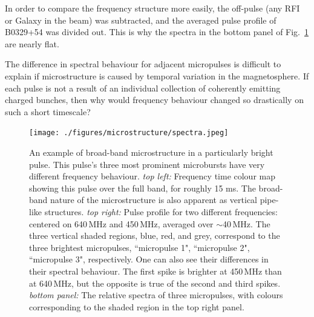 In order to 
compare the frequency structure more easily, the off-pulse 
(any RFI or Galaxy in the beam) was subtracted, and the 
averaged pulse profile of B0329+54 was divided out.
This is why the spectra in the bottom panel of Fig.~\ref{fig-spectralvar}
are nearly flat. 

The difference in spectral behaviour for 
adjacent micropulses is difficult to explain 
if microstructure is caused by temporal 
variation in the magnetosphere. If each pulse is not a result 
of an individual collection of coherently emitting 
charged bunches, then why would frequency behaviour 
changed so drastically on such a short timescale?

\begin{figure}[!h]
\vspace{-0.5cm}
\begin{center}
\texttt{[image: ./figures/microstructure/spectra.jpeg]}
\caption{An example of broad-band microstructure in a 
particularly bright pulse. This pulse's three most prominent 
microbursts have very different frequency behaviour. \textit{top left:}
Frequency time colour map showing this pulse over the 
full band, for roughly 15 ms. The broad-band nature of 
the microstructure is also apparent as 
vertical pipe-like structures. \textit{top right:} Pulse 
profile for two different frequencies: centered on 640\,MHz and 450\,MHz, 
averaged over $\sim$40\,MHz. The three vertical shaded regions, 
blue, red, and grey, correspond to the three brightest 
micropulses, ``micropulse 1", ``micropulse 2", ``micropulse 3", 
respectively. One can also see their differences in their 
spectral behaviour. The first spike is brighter at 450\,MHz
than at 640\,MHz, but the opposite is true of the
second and third spikes. \textit{bottom panel:} The relative 
spectra of three micropulses, with colours corresponding 
to the shaded region in the top right panel.}
\label{fig-spectralvar}
\end{center}
\end{figure}



